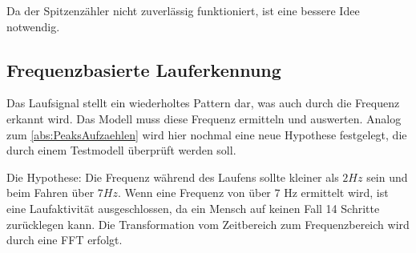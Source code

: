 


Da der Spitzenzähler nicht zuverlässig funktioniert, ist eine bessere Idee notwendig. 


\subsection{Frequenzbasierte Lauferkennung} %

Das Laufsignal stellt ein wiederholtes Pattern dar, was auch durch die Frequenz erkannt wird.
Das Modell muss diese Frequenz ermitteln und auswerten.
Analog zum \autoref{abs:PeaksAufzaehlen} wird hier nochmal eine neue Hypothese festgelegt, die durch einem Testmodell überprüft werden soll.

Die Hypothese: Die Frequenz während des Laufens sollte kleiner als $2 Hz$ sein und beim Fahren über $7 Hz$. Wenn eine Frequenz von über $7$ Hz ermittelt wird, ist eine Laufaktivität ausgeschlossen, da ein Mensch auf keinen Fall 14 Schritte zurücklegen kann. Die Transformation vom Zeitbereich zum Frequenzbereich wird durch eine FFT erfolgt.

